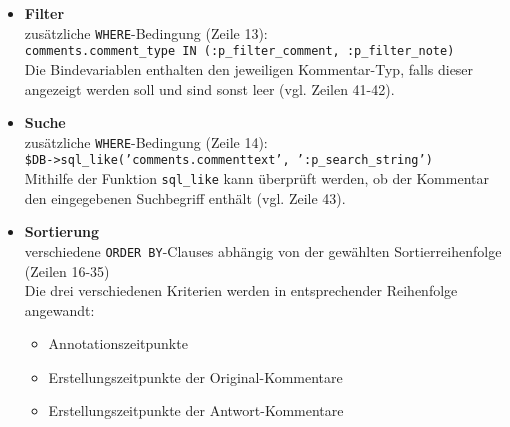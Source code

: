 \begin{itemize}
\item \textbf{Filter}\\
zusätzliche \texttt{WHERE}-Bedingung (Zeile 13):\\
\texttt{comments.comment_type IN (:p_filter_comment, :p_filter_note)}\\
Die Bindevariablen enthalten den jeweiligen Kommentar-Typ, falls dieser angezeigt werden soll und sind sonst leer (vgl. Zeilen 41-42).
\item \textbf{Suche}\\
zusätzliche \texttt{WHERE}-Bedingung (Zeile 14):\\
\texttt{\$DB->sql_like('comments.commenttext', ':p_search_string')}\\
Mithilfe der Funktion \texttt{sql_like} kann überprüft werden, ob der Kommentar den eingegebenen Suchbegriff enthält (vgl. Zeile 43).
\item \textbf{Sortierung}\\
verschiedene \texttt{ORDER BY}-Clauses abhängig von der gewählten Sortierreihenfolge (Zeilen 16-35)\\
Die drei verschiedenen Kriterien werden in entsprechender Reihenfolge angewandt:
\begin{itemize}
\item Annotationszeitpunkte
\item Erstellungszeitpunkte der Original-Kommentare
\item Erstellungszeitpunkte der Antwort-Kommentare
\end{itemize}
\end{itemize}

